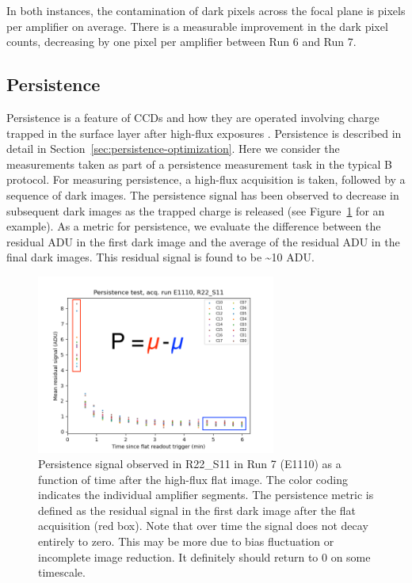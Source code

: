 In both instances, the contamination of dark pixels across the focal plane is  pixels per amplifier on average. There is a measurable improvement in the dark pixel counts, decreasing by one pixel per amplifier between Run 6 and Run 7.

\clearpage
\subsection{Persistence}\label{initPersistenceChar}

Persistence is a feature of CCDs and how they are operated involving charge trapped in the
surface layer after high-flux exposures \citep{dmtn-276,2024SPIE13103E..0WU}.
Persistence is described in detail in Section~\ref{sec:persistence-optimization}.
Here we consider the measurements taken as
part of a persistence measurement task in the typical B protocol. For
measuring persistence, a high-flux acquisition is taken, followed by a
sequence of dark images. The persistence signal has been observed to
decrease in subsequent dark images as the trapped charge is released (see Figure~\ref{fig:persistence-decay} for an example). As a metric for persistence,
we evaluate the difference between the residual ADU in the first dark
image and the average of the residual ADU in the final dark images. This residual signal is found to be \textasciitilde10 ADU.

\begin{figure}[ht]
\begin{centering}
\includegraphics[width=0.7\textwidth]{figures/baselineCharacterization/persistence_plot_LSSTCam_R22_S11_u_lsstccs_eo_persistence_E1110_w_2024_35_20240926T235141Z.png}
\caption{Persistence signal observed in R22\_S11 in Run 7 (E1110) as a function of time after the high-flux flat image.  The color coding indicates the individual amplifier segments.  The persistence metric is defined as the residual signal in the first dark image after the flat acquisition (red box).  Note that over time the signal does not decay entirely to zero. This may be more due to bias fluctuation or incomplete image reduction. It definitely should return to 0 on some timescale.}
\label{fig:persistence-decay}
\end{centering}
\end{figure}

